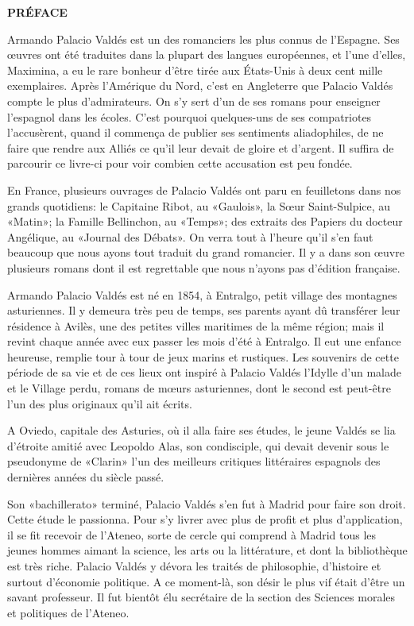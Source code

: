 \begin{flushright}
\textbf{PRÉFACE}
\end{flushright}

Armando Palacio Valdés est un des romanciers les plus connus de
l'Espagne. Ses œuvres ont été traduites dans la plupart des langues
européennes, et l'une d'elles, Maximina, a eu le rare bonheur d'être
tirée aux États-Unis à deux cent mille exemplaires. Après l'Amérique du
Nord, c'est en Angleterre que Palacio Valdés compte le plus
d'admirateurs. On s'y sert d'un de ses romans pour enseigner l'espagnol
dans les écoles. C'est pourquoi quelques-uns de ses compatriotes
l'accusèrent, quand il commença de publier ses sentiments aliadophiles,
de ne faire que rendre aux Alliés ce qu'il leur devait de gloire et
d'argent. Il suffira de parcourir ce livre-ci pour voir combien cette
accusation est peu fondée.

En France, plusieurs ouvrages de Palacio Valdés ont paru en feuilletons
dans nos grands quotidiens: le Capitaine Ribot, au «Gaulois», la
Sœur Saint-Sulpice, au «Matin»; la Famille Bellinchon, au «Temps»;
des extraits des Papiers du docteur Angélique, au «Journal des
Débats». On verra tout à l'heure qu'il s'en faut beaucoup que nous ayons
tout traduit du grand romancier. Il y a dans son œuvre plusieurs
romans dont il est regrettable que nous n'ayons pas d'édition
française.

\horizontalLine

Armando Palacio Valdés est né en 1854, à Entralgo, petit village des
montagnes asturiennes. Il y demeura très peu de temps, ses parents ayant
dû trans\-férer leur résidence à Avilès, une des petites villes maritimes
de la même région; mais il revint chaque année avec eux passer les mois
d'été à Entralgo. Il eut une enfance heureuse, remplie tour à tour de
jeux marins et rustiques. Les souvenirs de cette période de sa vie et de
ces lieux ont inspiré à Palacio Valdés l'Idylle d'un malade et le
Village perdu, romans de mœurs asturiennes, dont le second est
peut-être l'un des plus originaux qu'il ait écrits.

A Oviedo, capitale des Asturies, où il alla faire ses études, le jeune
Valdés se lia d'étroite amitié avec Leopoldo Alas, son condisciple, qui
devait devenir sous le pseudonyme de «Clarin» l'un des meilleurs
critiques littéraires espagnols des dernières années du siècle passé.

Son «bachillerato» terminé, Palacio Valdés s'en fut à Madrid pour faire
son droit. Cette étude le passionna. Pour s'y livrer avec plus de profit
et plus d'application, il se fit recevoir de l'Ateneo, sorte de cercle
qui comprend à Madrid tous les jeunes hommes aimant la science, les
arts ou la littérature, et dont la bibliothèque est très riche. Palacio
Valdés y dévora les traités de philosophie, d'histoire et surtout
d'économie politique. A ce moment-là, son désir le plus vif était d'être
un savant professeur. Il fut bientôt élu secrétaire de la section des
Sciences morales et politiques de l'Ateneo.

